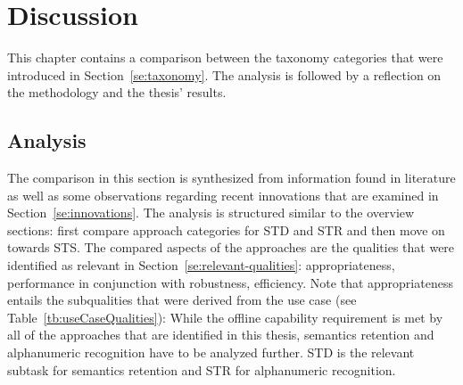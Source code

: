 \chapter{Discussion}\label{ch:discussion}
This chapter contains a comparison between the taxonomy categories that were introduced in
Section~\ref{se:taxonomy}.
The analysis is followed by a reflection on the methodology and the thesis' results.

\section{Analysis}\label{se:analysis}
The comparison in this section is synthesized from information found in literature as well as
some observations regarding recent innovations that are examined in Section~\ref{se:innovations}.
The analysis is structured similar to the overview sections: first compare approach categories
for \ac{STD} and \ac{STR} and then move on towards \ac{STS}.
The compared aspects of the approaches are the qualities that were identified as relevant in
Section~\ref{se:relevant-qualities}: appropriateness, performance in conjunction with robustness,
efficiency.
Note that appropriateness entails the subqualities that were derived from the use
case (see Table~\ref{tb:useCaseQualities}):
While the offline capability requirement is met by all of the approaches that are identified in this
thesis, semantics retention and alphanumeric recognition have to be analyzed further.
\ac{STD} is the relevant subtask for semantics retention and \ac{STR} for alphanumeric recognition.

